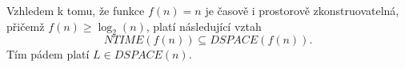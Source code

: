\documentclass[a4paper,12pt]{article}
\begin{document}
\begin{enumerate}[label=\textbf{\arabic*}.]
 \enlargethispage*{5em}
 Vzhledem k tomu, že funkce $f(n) = n$ je časově i prostorově zkonstruovatelná, přičemž $f(n) \geq \log_2(n)$, platí následující vztah
 $$
  NTIME(f(n)) \subseteq DSPACE(f(n)).
 $$
 Tím pádem platí $L \in DSPACE(n)$.
 
  
  \end{enumerate}
\end{document}
